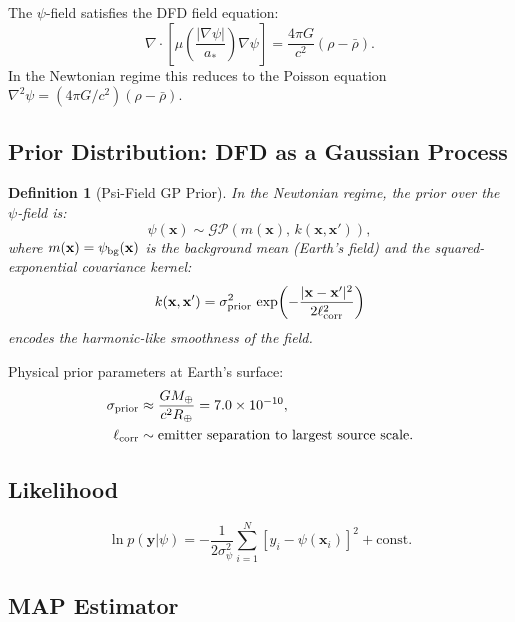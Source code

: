 \documentclass[aps,prd,twocolumn,superscriptaddress,nofootinbib]{revtex4-2}
\newcommand{\astar}{a_*}
\newcommand{\xvec}{\mathbf{x}}
\newtheorem{definition}{Definition}
\begin{document}
The $\psi$-field satisfies the DFD field equation:
\begin{equation}
\nabla\cdot\!\left[\mu\!\left(\frac{|\nabla\psi|}{\astar}\right)\nabla\psi\right]
= \frac{4\pi G}{c^2}(\rho - \bar\rho).
\label{eq:field-prior}
\end{equation}
In the Newtonian regime this reduces to the Poisson equation
$\nabla^2\psi = (4\pi G/c^2)(\rho-\bar\rho)$.

\subsection{Prior Distribution: DFD as a Gaussian Process}

\begin{definition}[Psi-Field GP Prior]
In the Newtonian regime, the prior over the $\psi$-field is:
\begin{equation}
\psi(\xvec) \sim \mathcal{GP}(m(\xvec),\, k(\xvec,\xvec')),
\label{eq:gp-prior}
\end{equation}
where $m(\xvec) = \psi_{\rm bg}(\xvec)$ is the background mean
(Earth's field) and the squared-exponential covariance kernel:
\begin{equation}
k(\xvec,\xvec') = \sigma_{\rm prior}^2\,
\exp\!\left(-\frac{|\xvec-\xvec'|^2}{2\ell_{\rm corr}^2}\right)
\label{eq:kernel}
\end{equation}
encodes the harmonic-like smoothness of the field.
\end{definition}

Physical prior parameters at Earth's surface:
\begin{align}
\sigma_{\rm prior} &\approx \frac{GM_\oplus}{c^2 R_\oplus}
= 7.0\times10^{-10}, \\
\ell_{\rm corr} &\sim \text{emitter separation to largest source scale}.
\end{align}

\subsection{Likelihood}

\begin{equation}
\ln p(\mathbf{y}|\psi) = -\frac{1}{2\sigma_\psi^2}
\sum_{i=1}^N [y_i - \psi(\xvec_i)]^2 + \mathrm{const.}
\label{eq:log-lik}
\end{equation}

\subsection{MAP Estimator}
\end{document}
